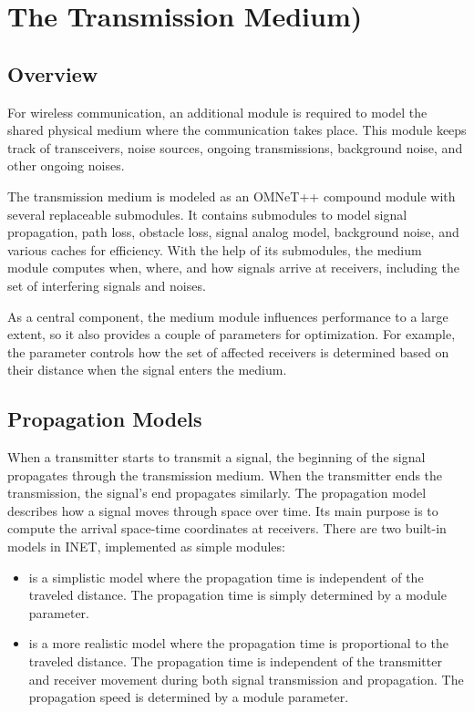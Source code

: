 \chapter{The Transmission Medium)}
\label{cha:transmission-medium}

\section{Overview}

For wireless communication, an additional module is required to model the
shared physical medium where the communication takes place. This module
keeps track of transceivers, noise sources, ongoing transmissions,
background noise, and other ongoing noises.

The transmission medium is modeled as an OMNeT++ compound module with
several replaceable submodules. It contains submodules to model signal
propagation, path loss, obstacle loss, signal analog model, background
noise, and various caches for efficiency. With the help of its submodules,
the medium module computes when, where, and how signals arrive at
receivers, including the set of interfering signals and noises.

As a central component, the medium module influences performance to a large
extent, so it also provides a couple of parameters for optimization. For
example, the  parameter controls how the set of affected
receivers is determined based on their distance when the signal enters the
medium.

\section{Propagation Models}

When a transmitter starts to transmit a signal, the beginning of the signal
propagates through the transmission medium. When the transmitter ends the
transmission, the signal's end propagates similarly. The propagation model
describes how a signal moves through space over time. Its main purpose is
to compute the arrival space-time coordinates at receivers. There are two
built-in models in INET, implemented as simple modules:

\begin{itemize}
        \item {} is a simplistic model where the propagation time is independent of the traveled distance. The propagation time is simply determined by a module parameter.
        \item {} is a more realistic model where the propagation time is proportional to the traveled distance. The propagation time is independent of the transmitter and receiver movement during both signal transmission and propagation. The propagation speed is determined by a module parameter.
\end{itemize}

